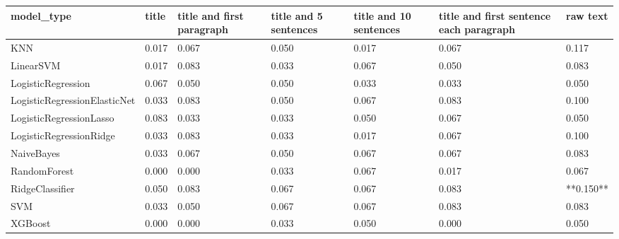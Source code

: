 \begin{tabular}{lllllll}
\toprule
                  model\_type & title & title and first paragraph & title and 5 sentences & title and 10 sentences & title and first sentence each paragraph &  raw text \\
\midrule
                         KNN & 0.017 &                     0.067 &                 0.050 &                  0.017 &                                   0.067 &     0.117 \\
                   LinearSVM & 0.017 &                     0.083 &                 0.033 &                  0.067 &                                   0.050 &     0.083 \\
          LogisticRegression & 0.067 &                     0.050 &                 0.050 &                  0.033 &                                   0.033 &     0.050 \\
LogisticRegressionElasticNet & 0.033 &                     0.083 &                 0.050 &                  0.067 &                                   0.083 &     0.100 \\
     LogisticRegressionLasso & 0.083 &                     0.033 &                 0.033 &                  0.050 &                                   0.067 &     0.050 \\
     LogisticRegressionRidge & 0.033 &                     0.083 &                 0.033 &                  0.017 &                                   0.067 &     0.100 \\
                  NaiveBayes & 0.033 &                     0.067 &                 0.050 &                  0.067 &                                   0.067 &     0.083 \\
                RandomForest & 0.000 &                     0.000 &                 0.033 &                  0.067 &                                   0.017 &     0.067 \\
             RidgeClassifier & 0.050 &                     0.083 &                 0.067 &                  0.067 &                                   0.083 & **0.150** \\
                         SVM & 0.033 &                     0.050 &                 0.067 &                  0.067 &                                   0.083 &     0.083 \\
                     XGBoost & 0.000 &                     0.000 &                 0.033 &                  0.050 &                                   0.000 &     0.050 \\
\bottomrule
\end{tabular}
